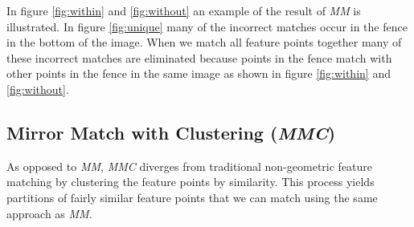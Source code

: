 \documentclass[conference]{IEEEtran}
\begin{document}
In figure \ref{fig:within} and \ref{fig:without} an example of the 
result of \emph{MM} is illustrated. In figure \ref{fig:unique} many of 
the incorrect matches occur in the fence in the bottom of the image.  
When we match all feature points together many of these incorrect 
matches are eliminated because points in the fence match with other 
points in the fence in the same image as shown in figure 
\ref{fig:within} and \ref{fig:without}.

\subsection{Mirror Match with Clustering (\emph{MMC})}
%
As opposed to \emph{MM}, \emph{MMC} diverges from traditional 
non-geometric feature matching by clustering the feature points by 
similarity. This process yields partitions of fairly similar feature 
points that we can match using the same approach as \emph{MM}. 
%
%
%
%
\end{document}
